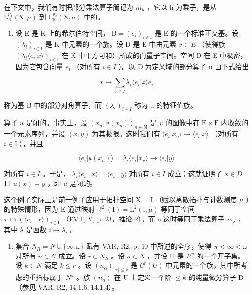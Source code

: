 在下文中，我们有时把部分乘法算子简记为 \(m_{h}\) ，它以 h 为乘子，是从 \(\mathrm{L}_{\mathrm{K}}^{p_{1}}(\mathrm{X},\mu)\) 到 \(\mathrm{L}_{\mathrm{K}}^{p_{2}}(\mathrm{X},\mu)\) 中的。

\begin{enumerate}
\def\labelenumi{\arabic{enumi})}
\setcounter{enumi}{1}
\tightlist
\item
  设 E 是 K 上的希尔伯特空间， \(\mathrm{B} = (e_i)_{i \in \mathrm{I}}\) 是 E 的一个标准正交基。设 \((\lambda_i)_{i \in \mathrm{I}}\) 是 K 中元素的一个族。设 D 是 E 中由元素 \(x \in E\) （使得族 \((\lambda_i \langle e_i | x \rangle)_{i \in \mathrm{I}}\) 在 K 中平方可和）所成的向量子空间。空间 D 在 E 中稠密，因为它包含向量 \(e_i\) （对所有 \(i \in I\) ）。以 D 为定义域的部分算子 u 由下式给出
\end{enumerate}

\[
x \mapsto \sum_ {i \in I} \lambda_ {i} \langle e _ {i} | x \rangle e _ {i}
\]

称为基 B 中的部分对角算子，而 \((\lambda_{i})_{i\in I}\) 称为 u 的特征值族。

算子 \(u\) 是闭的。事实上，设 \((x_{n}, u(x_{n}))_{n \in \mathbf{N}}\) 是 \(u\) 的图像中在 \(\mathrm{E} \times \mathrm{E}\) 内收敛的一个元素序列，并设 \((x, y)\) 为其极限。这时我们有 \(\langle e_{i} | x_{n} \rangle \to \langle e_{i} | x \rangle\) （对所有 \(i \in \mathrm{I}\) ），并且

\[
\langle e _ {i} | u (x _ {n}) \rangle = \lambda_ {i} \langle e _ {i} | x _ {n} \rangle \rightarrow \langle e _ {i} | y \rangle
\]

对所有 \(i \in I\) 。于是， \(\lambda_{i} \langle e_{i} \mid x \rangle = \langle e_{i} \mid y \rangle\) 对所有 \(i \in I\) 成立；这就证明了 \(x \in D\) 且 \(u(x) = y\) ，即 \(u\) 是闭的。

这个例子实际上是前一例子应用于拓扑空间 X = I （赋以离散拓扑与计数测度 \(\mu\) ）的特殊情形，因为 E 通过映射 \(\ell^{2}(\mathrm{I}) = \mathrm{L}^{2}(\mathrm{I}, \mu)\) 等同于空间 \(x \mapsto (\langle e_{i} \mid x \rangle)_{i \in \mathrm{I}}\) （EVT, V, p. 23，推论 2），而 u 这时等同于乘法算子 \(m_{\lambda}\) ，其中 \(\lambda\) 是函数 \(i \mapsto \lambda_{i}\) 。

\begin{enumerate}
\def\labelenumi{\arabic{enumi})}
\setcounter{enumi}{2}
\tightlist
\item
  集合 \(N_{R} = N \cup \{\infty, \omega\}\) 赋有 VAR, R2, p. 10 中所述的全序，使得 \(n < \infty < \omega\) 对所有 \(n \in N\) 成立。设 \(r \in N_{R}\) 。设 \(n \in N\) ，并设 U 是 \(R^{n}\) 的一个开子集。设 \(k \in N\) 满足 \(k \leqslant r\) 。设 \((n_{\alpha})_{|\alpha| \leqslant k}\) 是 \(\mathcal{C}^{r}(U)\) 中元素的一个族，其中所考虑的重指标属于 \(N^{n}\) 。族 \((n_{\alpha})\) 在 U 上定义一个阶 \(\leqslant k\) 的纯量微分算子 D （参见 VAR, R2, 14.1.6, 14.1.4）。
\end{enumerate}

